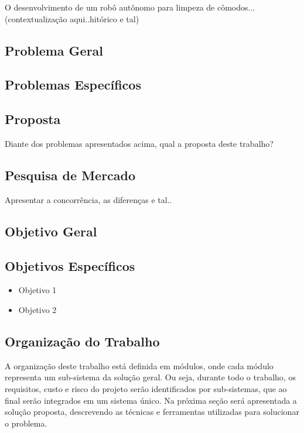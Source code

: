 O desenvolvimento de um robô autônomo para limpeza de cômodos... (contextualização aqui..hitórico e tal)

\subsection{Problema Geral} %
\label{sub:problemaGeral}


\subsection{Problemas Específicos} %
\label{sub:problemas_específicos}


\subsection{Proposta} %
\label{sub:proposta}
	Diante dos problemas apresentados acima, qual a proposta deste trabalho?

\subsection{Pesquisa de Mercado} %
\label{sub:pesquisa_de_mercado}
Apresentar a concorrência, as diferenças e tal..

\subsection{Objetivo Geral} %
\label{sub:objetivo_geral}


\subsection{Objetivos Específicos} %
\label{sub:objetivos_específicos}
	
	\begin{itemize}
		\item Objetivo 1
		\item Objetivo 2
	\end{itemize}

\subsection{Organização do Trabalho} %
\label{sub:organização_do_trabalho}
	A organização deste trabalho está definida em módulos, onde cada módulo representa um sub-sistema da solução geral. Ou seja, durante todo o trabalho, os requisitos, custo e risco do projeto serão identificados por sub-sistemas, que ao final serão integrados em um sistema único. Na próxima seção será apresentada a solução proposta, descrevendo as técnicas e ferramentas utilizadas para solucionar o problema. 
